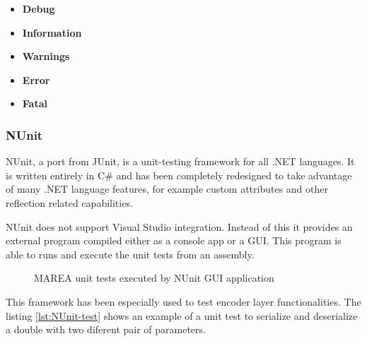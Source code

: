 \begin{itemize}
\item \textbf{Debug}   
\item \textbf{Information} 
\item \textbf{Warnings}
\item \textbf{Error} 
\item \textbf{Fatal} 
\end{itemize}

\subsubsection{NUnit}\label{SSS:Tools-Nunit}

NUnit, a port from JUnit, is a unit-testing framework for all .NET languages. It is written entirely in C\# and has been completely redesigned to take advantage of many .NET language features, for example custom attributes and other reflection related capabilities. 

NUnit does not support Visual Studio integration. Instead of this it provides an external program compiled either as a console app or a GUI. This program is able to runs and execute the unit tests from an assembly.

\begin{figure}[H]\begin{center}
 \centering
  \captionsetup{justification=centering}
  \caption{MAREA unit tests executed by NUnit GUI application\label{fig:tools-NUnitGUI}}
\end{center}\end{figure}

This framework has been especially used to test encoder layer functionalities. The listing \ref{lst:NUnit-test} shows an example of a unit test to serialize and deserialize a double with two diferent pair of parameters.

